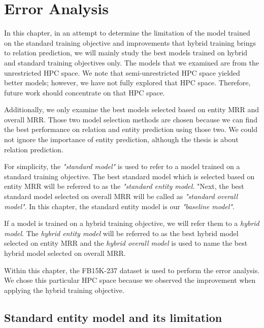 \chapter{Error Analysis}
\label{cha:Error Analysis}
In this chapter, in an attempt to determine the limitation of the model trained on the standard training objective and improvements that hybrid training brings to relation prediction, we will mainly study the best models trained on hybrid and standard training objectives only. The models that we examined are from the unrestricted HPC space. We note that semi-unrestricted HPC space yielded better models; however, we have not fully explored that HPC space. Therefore, future work should concentrate on that HPC space.

Additionally, we only examine the best models selected based on entity MRR and overall MRR. Those two model selection methods are chosen because we can find the best performance on relation and entity prediction using those two. We could not ignore the importance of entity prediction, although the thesis is about relation prediction. 

For simplicity, the \textit{"standard model"} is used to refer to a model trained on a standard training objective. The best standard model which is selected based on entity MRR will be referred to as the \textit{"standard entity model}. "Next, the best standard model selected on overall MRR will be called as \textit{"standard overall model"}. In this chapter, the standard entity model is our \textit{"baseline model"}.

If a model is trained on a hybrid training objective, we will refer them to a \textit{hybrid model}. The \textit{hybrid entity model} will be referred to as the best hybrid model selected on entity MRR and the \textit{hybrid overall model} is used to name the best hybrid model selected on overall MRR. 

Within this chapter, the FB15K-237 dataset is used to perform the error analysis. We chose this particular HPC space because we observed the improvement when applying the hybrid training objective. 

\section{Standard entity model and its limitation}

